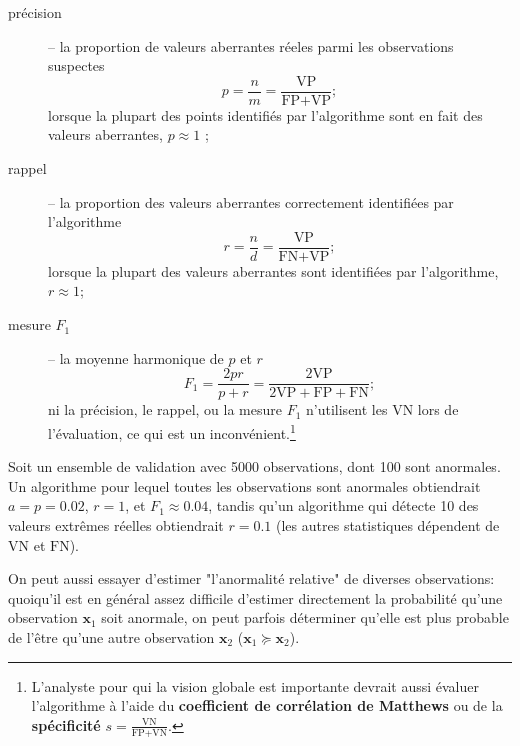 \begin{description}
\item[pr\'ecision]-- la proportion de valeurs aberrantes r\'eeles parmi les observations suspectes $$p=\frac{n}{m}=\frac{\text{VP}}{\text{FP}+\text{VP}};$$ lorsque la plupart des points identifiés par l'algorithme sont en fait des valeurs aberrantes, $p\approx 1$ ;
\item[rappel]-- la proportion des valeurs aberrantes correctement identifi\'ees par l'algorithme
$$r=\frac{n}{d}=\frac{\text{VP}}{\text{FN}+\text{VP}};$$ lorsque la plupart des valeurs aberrantes sont identifi\'ees par l'algorithme, $r\approx 1$;
\item[mesure $F_1$]-- la moyenne harmonique de $p$ et $r$ 
$$F_1=\frac{2pr}{p+r}=\frac{2\text{VP}}{2\text{VP}+\text{FP}+\text{FN}};$$ ni la précision, le rappel, ou la mesure $F_1$ n'utilisent les $\text{VN}$ lors de l'évaluation, ce qui est un inconv\'enient.\footnote{L'analyste pour qui la vision globale est importante devrait aussi évaluer l'algorithme à l'aide du \textbf{coefficient de corrélation de Matthews} \cite{W_MCC} ou de la \textbf{sp\'ecificit\'e} $s=\frac{\text{VN}}{\text{FP}+\text{VN}}$.}
\end{description}
\begin{Exemple}Soit un ensemble de validation avec 5000 ob\-ser\-va\-tions, dont 100 sont anormales. Un algorithme pour lequel toutes les ob\-ser\-va\-tions sont anormales obtiendrait $a=p=0.02$, $r=1$, et $F_1\approx 0.04$, tandis qu'un algorithme qui détecte 10 des valeurs extrêmes réelles obtiendrait $r=0.1$ (les autres statistiques d\'ependent de $\text{VN}$ et $\text{FN}$).
\end{Exemple}
\newpage \noindent On peut aussi essayer d'estimer "l'anormalit\'e  relative" de diverses ob\-ser\-va\-tions: quoiqu'il est en g\'en\'eral assez difficile d'estimer directement la probabilité qu'une ob\-ser\-va\-tion $\mathbf{x}_1$ soit anormale, on peut parfois d\'eterminer qu'elle est plus probable de l'\^etre qu'une autre ob\-ser\-va\-tion $\mathbf{x}_2$ ($\mathbf{x}_1\succeq \mathbf{x}_2$). %
